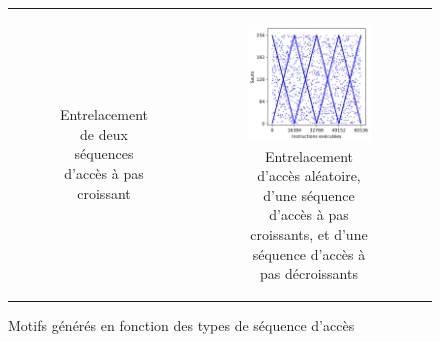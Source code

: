\begin{figure}
\begin{tabular}{c c c}
\begin{subfigure}[t]{0.3\linewidth}
			\caption{\label{fig:pattern-visual-strided-quad}Entrelacement de deux séquences d'accès à pas croissant}
		\end{subfigure} &
		\begin{subfigure}[t]{0.3\linewidth}
			\includegraphics[width=\linewidth]{graphics/figures/pattern-composed-32.png}
			\caption{\label{fig:pattern-visual-composed}Entrelacement d'accès aléatoire, d'une séquence d'accès à pas croissants, et d'une séquence d'accès à pas décroissants}
		\end{subfigure} \\
	\end{tabular}
	\caption{\label{fig:pattern-visual}Motifs générés en fonction des types de séquence d'accès}
\end{figure}



